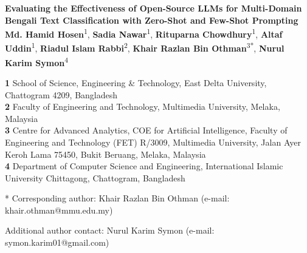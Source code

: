 \documentclass[10pt,letterpaper]{article}
\begin{document}
\vspace*{0.2in}

\begin{flushleft}
{\Large
\textbf{Evaluating the Effectiveness of Open-Source LLMs for Multi-Domain Bengali Text Classification with Zero-Shot and Few-Shot Prompting}
}
\newline
\\
\textbf{Md. Hamid Hosen}\textsuperscript{1},
\textbf{Sadia Nawar}\textsuperscript{1},
\textbf{Rituparna Chowdhury}\textsuperscript{1},
\textbf{Altaf Uddin}\textsuperscript{1},
\textbf{Riadul Islam Rabbi}\textsuperscript{2},
\textbf{Khair Razlan Bin Othman}\textsuperscript{3*},
\textbf{Nurul Karim Symon}\textsuperscript{4}
\\
\bigskip

\textbf{1} School of Science, Engineering \& Technology, East Delta University, Chattogram 4209, Bangladesh
\\
\textbf{2} Faculty of Engineering and Technology, Multimedia University, Melaka, Malaysia
\\
\textbf{3} Centre for Advanced Analytics, COE for Artificial Intelligence, Faculty of Engineering and Technology (FET) R/3009, Multimedia University, Jalan Ayer Keroh Lama 75450, Bukit Beruang, Melaka, Malaysia
\\
\textbf{4} Department of Computer Science and Engineering, International Islamic University Chittagong, Chattogram, Bangladesh
\\
\bigskip

* Corresponding author:  
Khair Razlan Bin Othman (e-mail: khair.othman@mmu.edu.my)  

Additional author contact:  
Nurul Karim Symon (e-mail: symon.karim01@gmail.com)

\end{flushleft}
\end{document}
